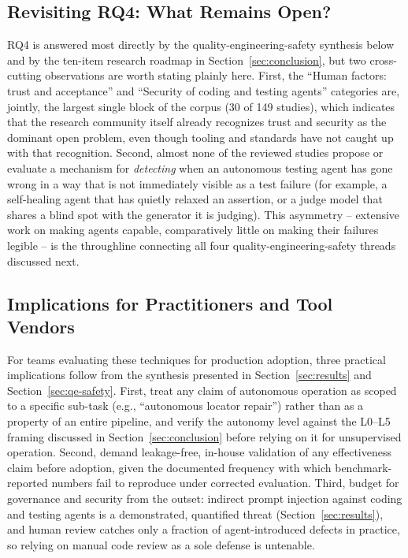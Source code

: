 \subsection{Revisiting RQ4: What Remains Open?}
RQ4 is answered most directly by the quality-engineering-safety
synthesis below and by the ten-item research roadmap in
Section~\ref{sec:conclusion}, but two cross-cutting observations are
worth stating plainly here. First, the ``Human factors: trust and
acceptance'' and ``Security of coding and testing agents'' categories
are, jointly, the largest single block of the corpus (30 of 149
studies), which indicates that the research community itself already
recognizes trust and security as the dominant open problem, even though
tooling and standards have not caught up with that recognition.
Second, almost none of the reviewed studies propose or evaluate a
mechanism for \emph{detecting} when an autonomous testing agent has
gone wrong in a way that is not immediately visible as a test failure
(for example, a self-healing agent that has quietly relaxed an
assertion, or a judge model that shares a blind spot with the
generator it is judging). This asymmetry -- extensive work on making
agents capable, comparatively little on making their failures legible
-- is the throughline connecting all four quality-engineering-safety
threads discussed next.

\subsection{Implications for Practitioners and Tool Vendors}
\label{subsec:implications}
For teams evaluating these techniques for production adoption, three
practical implications follow from the synthesis presented in
Section~\ref{sec:results} and Section~\ref{sec:qe-safety}. First, treat
any claim of autonomous operation as scoped to a specific sub-task
(e.g., ``autonomous locator repair'') rather than as a property of an
entire pipeline, and verify the autonomy level against the L0--L5
framing discussed in Section~\ref{sec:conclusion} before relying on it
for unsupervised operation. Second, demand leakage-free, in-house
validation of any effectiveness claim before adoption, given the
documented frequency with which benchmark-reported numbers fail to
reproduce under corrected evaluation. Third, budget for governance
and security from the outset: indirect prompt injection against coding
and testing agents is a demonstrated, quantified threat (Section~\ref{sec:results}),
and human review catches only a fraction of agent-introduced defects
in practice, so relying on manual code review as a sole defense is
untenable.

